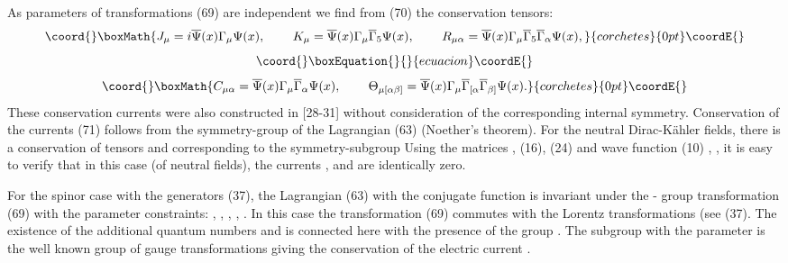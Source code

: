\documentclass[a4paper,12pt]{article}
\begin{document}
As parameters of transformations (69) are independent we find from (70) the
conservation tensors:
\[\coord{}\boxMath{
J_\mu =i\overline{\Psi }(x)\Gamma _\mu \Psi (x) ,
\hspace{0.3in}K_\mu = \overline{\Psi }(x)\Gamma _\mu
\overline{\Gamma }_5\Psi (x) ,\hspace{0.3in} R_{\mu \alpha
}=\overline{\Psi }(x)\Gamma _\mu \overline{\Gamma }_5\overline{
\Gamma }_\alpha \Psi (x) ,
}{corchetes}{0pt}\coordE{}\]
\vspace{-8mm}
\begin{equation}\coord{}\boxEquation{  \label{71}
}{  }{ecuacion}\coordE{}\end{equation}
\vspace{-8mm}
\[\coord{}\boxMath{
C_{\mu \alpha }=\overline{\Psi }(x)\Gamma _\mu \overline{\Gamma
}_\alpha \Psi (x) ,\hspace{0.3in}\Theta _{\mu [\alpha \beta
]}=\overline{\Psi } (x)\Gamma _\mu \overline{\Gamma }_{[\alpha
}\overline{\Gamma }_{\beta ]}\Psi (x) .
}{corchetes}{0pt}\coordE{}\]
These conservation currents were also constructed in [28-31]
without consideration of the corresponding internal symmetry.
Conservation of the currents (71) follows from the symmetry-group
\coordHE{} of the Lagrangian (63) (Noether's theorem).
For the neutral Dirac-K\"ahler fields, there is a conservation of
tensors \coordHE{} and \myHighlight{$\Theta _{\mu [\alpha \beta ]}$}\coordHE{}
corresponding to the symmetry-subgroup \coordHE{} Using the
matrices \myHighlight{$\Gamma _\mu $}\coordHE{}, \myHighlight{$\overline{\Gamma }_\mu $}\coordHE{} (16), (24) and
wave function (10) \coordHE{}, \coordHE{}, it is easy to verify that
in this case (of neutral fields), the currents \coordHE{}, \coordHE{}
and \coordHE{} are identically zero.

For the spinor case with the generators (37), the Lagrangian (63)
with the conjugate function \coordHE{} is invariant under the \coordHE{} - group
transformation (69) with the parameter constraints: \myHighlight{$\alpha
^{*}=-\alpha $}\coordHE{}, \myHighlight{$\beta _\mu ^{*}=-\beta _\mu $}\coordHE{}, \myHighlight{$\omega _{\mu \nu
}^{*}=\omega _{\mu \nu }$}\coordHE{}, \myHighlight{$\delta _\mu ^{*}=\delta _\mu $}\coordHE{}, \myHighlight{$\xi
^{*}=-\xi $}\coordHE{} . In this case the transformation (69) commutes with
the Lorentz transformations (see (37). The existence of the
additional quantum numbers \coordHE{} and
\myHighlight{$\overline{\varepsilon }$}\coordHE{} is connected here with the presence of
the group \coordHE{}. The subgroup \coordHE{} with the parameter \myHighlight{$ \alpha
$}\coordHE{} is the well known group of gauge transformations giving the
conservation of the electric current \coordHE{}.
\end{document}
